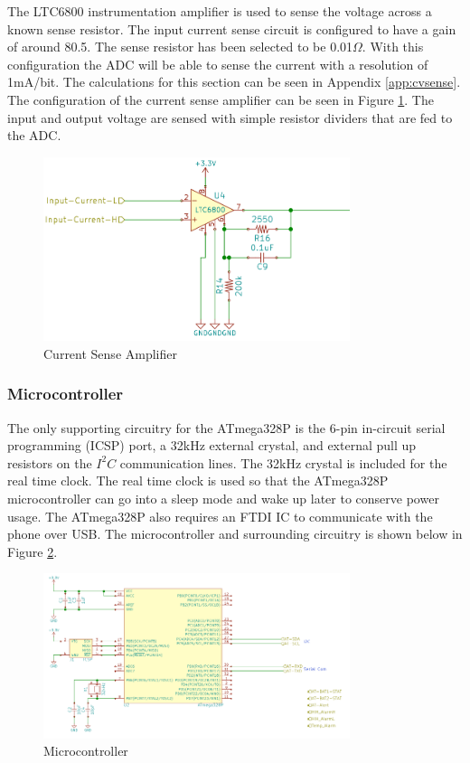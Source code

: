 \documentclass{article}
\numberwithin{figure}{section}
\numberwithin{equation}{section}
\begin{document}
{The LTC6800 instrumentation amplifier is used to sense the voltage across a known sense resistor. The input current sense circuit is configured to have a gain of around 80.5. The sense resistor has been selected to be 0.01$\Omega$. With this configuration the ADC will be able to sense the current with a resolution of 1mA/bit. The calculations for this section can be seen in Appendix \ref{app:cvsense}. The configuration of the current sense amplifier can be seen in Figure \ref{fig:AV}. The input and output voltage are sensed with simple resistor dividers that are fed to the ADC.
\begin{figure}[H]
	\centering
	\includegraphics[width=0.8\textwidth]{AtoV}
	\caption{Current Sense Amplifier}
	\label{fig:AV}
\end{figure}

\subsubsection{Microcontroller}

The only supporting circuitry for the ATmega328P is the 6-pin in-circuit serial programming (ICSP) port, a 32kHz external crystal, and external pull up resistors on the $I^2 C$ communication lines. The 32kHz crystal is included for the real time clock. The real time clock is used so that the ATmega328P microcontroller can go into a sleep mode and wake up later to conserve power usage. The ATmega328P also requires an FTDI IC to communicate with the phone over USB. The microcontroller and surrounding circuitry is shown below in Figure \ref{fig:mcu}.
\begin{figure}[H]
	\centering
	\includegraphics[width=0.8\textwidth]{Microcontroller}
	\caption{Microcontroller}
	\label{fig:mcu}
\end{figure}

}
\end{document}
